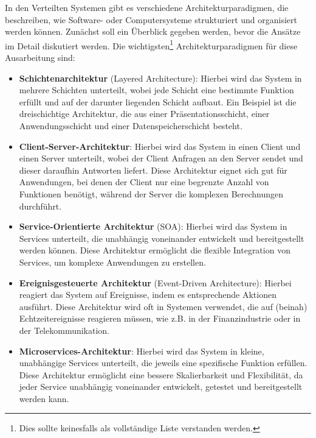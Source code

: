 \documentclass[../vs-script-first-v01.tex]{subfiles}
\begin{document}
In den Verteilten Systemen gibt es verschiedene Architekturparadigmen, die beschreiben, wie Software- oder Computersysteme strukturiert und organisiert werden können. 
Zunächst soll ein Überblick gegeben werden, bevor die Ansätze im Detail diskutiert werden. Die wichtigsten\footnote{Dies sollte keinesfalls als vollständige Liste verstanden werden.} Architekturparadigmen für diese Ausarbeitung sind:
\begin{itemize}  
\item \textbf{Schichtenarchitektur} (Layered Architecture): Hierbei wird das System in mehrere Schichten unterteilt, wobei jede Schicht eine bestimmte Funktion erfüllt und auf der darunter liegenden Schicht aufbaut. Ein Beispiel ist die dreischichtige Architektur, die aus einer Präsentationsschicht, einer Anwendungsschicht und einer Datenspeicherschicht besteht.

\item \textbf{Client-Server-Architektur}: Hierbei wird das System in einen Client und einen Server unterteilt, wobei der Client Anfragen an den Server sendet und dieser daraufhin Antworten liefert. Diese Architektur eignet sich gut für Anwendungen, bei denen der Client nur eine begrenzte Anzahl von Funktionen benötigt, während der Server die komplexen Berechnungen durchführt.

\item \textbf{Service-Orientierte Architektur} (SOA): Hierbei wird das System in Services unterteilt, die unabhängig voneinander entwickelt und bereitgestellt werden können. Diese Architektur ermöglicht die flexible Integration von Services, um komplexe Anwendungen zu erstellen.

\item \textbf{Ereignisgesteuerte Architektur} (Event-Driven Architecture): Hierbei reagiert das System auf Ereignisse, indem es entsprechende Aktionen ausführt. Diese Architektur wird oft in Systemen verwendet, die auf (beinah) Echtzeitereignisse reagieren müssen, wie z.B. in der Finanzindustrie oder in der Telekommunikation.

\item \textbf{Microservices-Architektur}: Hierbei wird das System in kleine, unabhängige Services unterteilt, die jeweils eine spezifische Funktion erfüllen. Diese Architektur ermöglicht eine bessere Skalierbarkeit und Flexibilität, da jeder Service unabhängig voneinander entwickelt, getestet und bereitgestellt werden kann.


\end{itemize}
\end{document}
